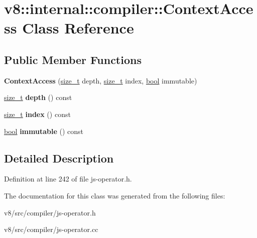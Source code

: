 \hypertarget{classv8_1_1internal_1_1compiler_1_1ContextAccess}{}\section{v8\+:\+:internal\+:\+:compiler\+:\+:Context\+Access Class Reference}
\label{classv8_1_1internal_1_1compiler_1_1ContextAccess}
\subsection*{Public Member Functions}
\begin{DoxyCompactItemize}
\item 
\mbox{\label{classv8_1_1internal_1_1compiler_1_1ContextAccess_acccc9ed95a7216cb0af5cc441dfa6be7}} 
{\bfseries Context\+Access} (\mbox{\hyperlink{classsize__t}{size\+\_\+t}} depth, \mbox{\hyperlink{classsize__t}{size\+\_\+t}} index, \mbox{\hyperlink{classbool}{bool}} immutable)
\item 
\mbox{\label{classv8_1_1internal_1_1compiler_1_1ContextAccess_a71a69209dab5cc786908fcd8605b4d08}} 
\mbox{\hyperlink{classsize__t}{size\+\_\+t}} {\bfseries depth} () const
\item 
\mbox{\label{classv8_1_1internal_1_1compiler_1_1ContextAccess_ac3715cda171e71f9479d0c73ccfa2321}} 
\mbox{\hyperlink{classsize__t}{size\+\_\+t}} {\bfseries index} () const
\item 
\mbox{\label{classv8_1_1internal_1_1compiler_1_1ContextAccess_a1a16581cdacbefb2b99843ef83d3cb78}} 
\mbox{\hyperlink{classbool}{bool}} {\bfseries immutable} () const
\end{DoxyCompactItemize}


\subsection{Detailed Description}


Definition at line 242 of file js-\/operator.\+h.



The documentation for this class was generated from the following files\+:\begin{DoxyCompactItemize}
\item 
v8/src/compiler/js-\/operator.\+h\item 
v8/src/compiler/js-\/operator.\+cc\end{DoxyCompactItemize}
